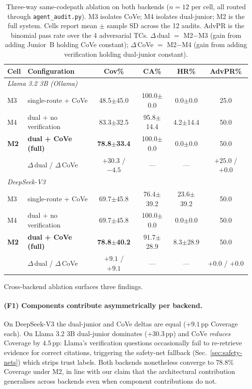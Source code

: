 \documentclass{article}
\begin{document}
\begin{table}[!ht]
\centering
\caption{Three-way same-codepath ablation on both backends
($n{=}12$ per cell, all routed through \texttt{agent\_audit.py}).
M3 isolates CoVe; M4 isolates dual-junior; M2 is the full system.
Cells report mean $\pm$ sample SD across the 12 audits. AdvPR is
the binomial pass rate over the 4 adversarial TCs. $\Delta$\,dual
$=$ M2$-$M3 (gain from adding Junior~B holding CoVe constant);
$\Delta$\,CoVe $=$ M2$-$M4 (gain from adding verification holding
dual-junior constant).}
\label{tab:ablation}
\small
\begin{tabular}{llcccc}
\toprule
\textbf{Cell} & \textbf{Configuration}
              & \textbf{Cov\%} & \textbf{CA\%} & \textbf{HR\%}
              & \textbf{AdvPR\%} \\
\midrule
\multicolumn{6}{l}{\emph{Llama 3.2 3B (Ollama)}} \\
M3 & single-route + CoVe            & 48.5$\pm$45.0 & 100.0$\pm$0.0 & 0.0$\pm$0.0  & 25.0 \\
M4 & dual + no verification         & 83.3$\pm$32.5 & 95.8$\pm$14.4 & 4.2$\pm$14.4 & 50.0 \\
\textbf{M2} & \textbf{dual + CoVe (full)}
   & \textbf{78.8$\pm$33.4} & 100.0$\pm$0.0 & 0.0$\pm$0.0 & 50.0 \\
\rowcolor{gray!10} & $\Delta$\,dual / $\Delta$\,CoVe
   & $+30.3$ / $-4.5$ & --- & --- & $+25.0$ / $+0.0$ \\
\midrule
\multicolumn{6}{l}{\emph{DeepSeek-V3}} \\
M3 & single-route + CoVe            & 69.7$\pm$45.8 & 76.4$\pm$39.2 & 23.6$\pm$39.2 & 50.0 \\
M4 & dual + no verification         & 69.7$\pm$45.8 & 100.0$\pm$0.0 & 0.0$\pm$0.0   & 50.0 \\
\textbf{M2} & \textbf{dual + CoVe (full)}
   & \textbf{78.8$\pm$40.2} & 91.7$\pm$28.9 & 8.3$\pm$28.9 & 50.0 \\
\rowcolor{gray!10} & $\Delta$\,dual / $\Delta$\,CoVe
   & $+9.1$ / $+9.1$ & --- & --- & $+0.0$ / $+0.0$ \\
\bottomrule
\end{tabular}
\end{table}

Cross-backend ablation surfaces three findings.

\paragraph{(F1) Components contribute asymmetrically per backend.}
On DeepSeek-V3 the dual-junior and CoVe deltas are equal
($+9.1$\,pp Coverage each). On Llama 3.2 3B dual-junior dominates
($+30.3$\,pp) and CoVe \emph{reduces} Coverage by $4.5$\,pp:
Llama's verification questions occasionally fail to re-retrieve
evidence for correct citations, triggering the safety-net fallback
(Sec.~\ref{sec:safety-nets}) which strips trust labels. Both
backends nonetheless converge to $78.8\%$ Coverage under M2, in line
with our claim that the architectural contribution generalises
across backends even when component contributions do not.
\end{document}
